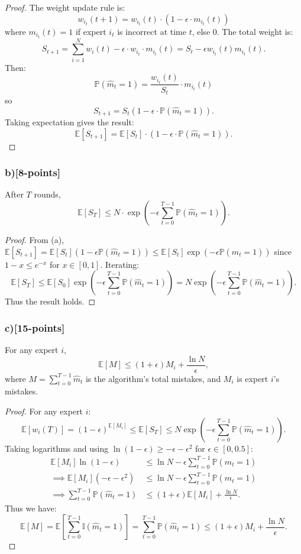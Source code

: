 \documentclass[12pt]{article}
\begin{document}
\begin{proof}
The weight update rule is:
\[
w_{i_t}(t+1) = w_{i_t}(t) \cdot (1 - \epsilon \cdot m_{i_t}(t))
\]
where $m_{i_t}(t) = 1$ if expert $i_t$ is incorrect at time $t$, else $0$. The total weight is:
\[
S_{t+1} = \sum_{i=1}^N w_i(t)  - \epsilon \cdot w_{i_t} \cdot m_{i_t}(t) = S_t - \epsilon  w_{i_t}(t) m_{i_t}(t).
\]
Then:
\[
\mathbb{P}(\hat{m}_t = 1) = \frac{w_{i_t}(t)}{S_t} \cdot m_{i_t}(t)
\]
so
\[
S_{t+1} = S_t (1 - \epsilon \cdot \mathbb{P}(\hat{m}_t = 1)).
\]
Taking expectation gives the result:
\[
\mathbb{E}[S_{t+1}] = \mathbb{E}[S_{t}] \cdot (1 - \epsilon \cdot \mathbb{P}(\hat{m}_t = 1)).
\]
\end{proof}

\subsubsection{b)[8-points]}
After $T$ rounds,
\[
\mathbb{E}[S_{T}] \leq N \cdot \exp\left(-\epsilon \sum_{t=0}^{T-1} \mathbb{P}(\hat{m}_t = 1)\right).
\]

\begin{proof}
From (a), $\mathbb{E}[S_{t+1}] = \mathbb{E}[S_{t}] (1 - \epsilon \mathbb{P}(\hat{m}_t = 1)) \leq \mathbb{E}[S_{t}] \exp(-\epsilon \mathbb{P}(\hat{m}_t = 1))$ since $1 - x \leq e^{-x}$ for $x \in [0,1]$. Iterating:
\[
\mathbb{E}[S_{T}] \leq \mathbb{E}[S_{0}] \exp\left(-\epsilon \sum_{t=0}^{T-1} \mathbb{P}(\hat{m}_t = 1)\right) = N \exp\left(-\epsilon \sum_{t=0}^{T-1} \mathbb{P}(\hat{m}_t = 1)\right).
\]
Thus the result holds.
\end{proof}

\subsubsection{c)[15-points]}
For any expert $i$,
\[
\mathbb{E}[M] \leq (1 + \epsilon) M_i + \frac{\ln N}{\epsilon},
\]
where $M = \sum_{t=0}^{T-1} \hat{m}_t$ is the algorithm's total mistakes, and $M_i$ is expert $i$'s mistakes.

\begin{proof}
For any expert $i$:
\[
\mathbb{E}[w_i(T)] = (1 - \epsilon)^{\mathbb{E}[M_i]} \leq \mathbb{E}[S_T] \leq N \exp\left(-\epsilon \sum_{t=0}^{T-1} \mathbb{P}(\hat{m}_t = 1)\right).
\]
Taking logarithms and using $\ln(1 - \epsilon) \geq -\epsilon - \epsilon^2$ for $\epsilon \in [0,0.5]$:
\begin{align*}
\mathbb{E}[M_i] \ln(1 - \epsilon) &\leq \ln N - \epsilon \sum_{t=0}^{T-1} \mathbb{P}(\hat{m}_t = 1) \\
\implies \mathbb{E}[M_i] (-\epsilon - \epsilon^2) &\leq \ln N - \epsilon \sum_{t=0}^{T-1} \mathbb{P}(\hat{m}_t = 1) \\
\implies \sum_{t=0}^{T-1} \mathbb{P}(\hat{m}_t = 1) &\leq (1 + \epsilon) \mathbb{E}[M_i] + \frac{\ln N}{\epsilon}.
\end{align*}
Thus we have:
\[
\mathbb{E}[M] = \mathbb{E}\left[\sum_{t=0}^{T-1} \mathbb{I}(\hat{m}_t = 1)\right] = \sum_{t=0}^{T-1} \mathbb{P}(\hat{m}_t = 1) \leq (1 + \epsilon) M_i + \frac{\ln N}{\epsilon}.
\]
\end{proof}
\end{document}
